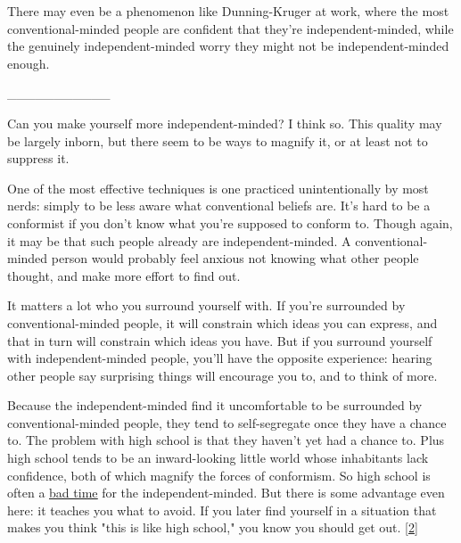 There
                  may even be a phenomenon like Dunning-Kruger at work, where
                  the most conventional-minded people are confident that they're
                  independent-minded, while the genuinely independent-minded
                  worry they might not be independent-minded enough.


                  \_\_\_\_\_\_\_\_\_\_\_
                  


                  Can you make yourself more independent-minded? I think so.
                  This quality may be largely inborn, but there seem to be ways
                  to magnify it, or at least not to suppress it.

One
                  of the most effective techniques is one practiced
                  unintentionally by most nerds: simply to be less aware what
                  conventional beliefs are. It's hard to be a conformist if you
                  don't know what you're supposed to conform to. Though again,
                  it may be that such people already are independent-minded. A
                  conventional-minded person would probably feel anxious not
                  knowing what other people thought, and make more effort to
                  find out.

It matters a lot who you surround
                  yourself with. If you're surrounded by conventional-minded
                  people, it will constrain which ideas you can express, and
                  that in turn will constrain which ideas you have. But if you
                  surround yourself with independent-minded people, you'll have
                  the opposite experience: hearing other people say surprising
                  things will encourage you to, and to think of more.

Because
                  the independent-minded find it uncomfortable to be surrounded
                  by conventional-minded people, they tend to self-segregate
                  once they have a chance to. The problem with high school is
                  that they haven't yet had a chance to. Plus high school tends
                  to be an inward-looking little world whose inhabitants lack
                  confidence, both of which magnify the forces of conformism. So
                  high school is often a
                  \href{http://www.paulgraham.com/nerds.html}{\underline{bad time}} for the
                  independent-minded. But there is some advantage even here: it
                  teaches you what to avoid. If you later find yourself in a
                  situation that makes you think "this is like high school," you
                  know you should get out.
                  [\href{\#f2n}{2}]

